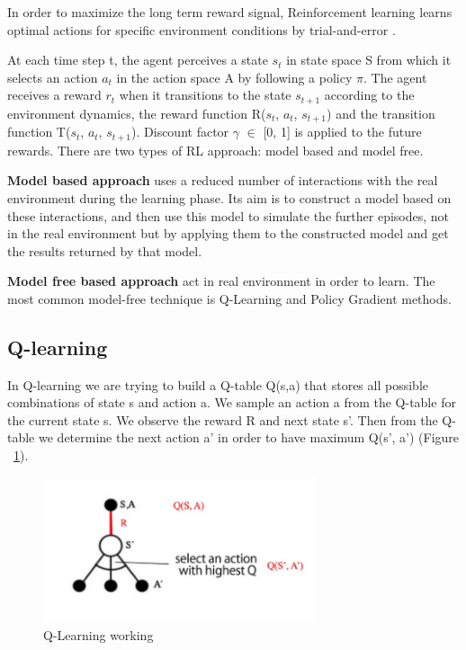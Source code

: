 \documentclass[12pt]{report}
\begin{document}
In order to maximize the long term reward signal, Reinforcement learning learns optimal actions for specific environment conditions by trial-and-error \cite{Barto}. 

At each time step t, the agent perceives a state $s_t$ in state space S from which it selects an action $a_t$ in the action space A by following a policy $\pi$. The agent receives a reward $r_t$ when it transitions to the state $s_{t+1}$ according to the environment dynamics, the reward function R($s_t$, $a_t$, $s_{t+1}$) and the transition function T($s_t$, $a_t$, $s_{t+1}$). Discount factor $\gamma$ $\in$ [0, 1] is applied to the future rewards. There are two types of RL approach: model based and model free. 

\textbf{Model based approach} uses a reduced number of interactions with the real environment during the learning phase. Its aim is to construct a model based on these interactions, and then use this model to simulate the further episodes, not in the real environment but by applying them to the constructed model and get the results returned by that model.

\textbf{Model free based approach} act in real environment in order to learn. The most common model-free technique is Q-Learning and Policy Gradient methods. 

\subsection{Q-learning} In Q-learning we are trying to build a Q-table Q(s,a) that stores all possible combinations of state s and action a. We sample an action a from the Q-table for the current state s. We observe the reward R and next state s'. Then from the Q-table we determine the next action a' in order to have maximum Q(s', a') (Figure ~\ref{fig:QLearning}). 

\begin{figure}[!h]
    \centering
    \includegraphics[width=8cm]{QLearning.png}
    \caption{Q-Learning working}
    \label{fig:QLearning}
\end{figure}
\end{document}
